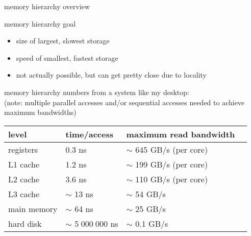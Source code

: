 \begin{frame}{memory hierarchy overview}
\end{frame}

\begin{frame}{memory hierarchy goal}
    \begin{itemize}
    \item size of largest, slowest storage
    \item speed of smallest, fastest storage
        \vspace{.5cm}
    \item not actually possible, but can get pretty close due to locality
    \end{itemize}
\end{frame}

\begin{frame}{memory hierarchy numbers}
from a system like my desktop: \\
    {\small (note: multiple parallel accesses and/or sequential accesses needed to achieve maximum bandwidths)} \\
\begin{tabular}{l|lll}
level & time/access & maximum read bandwidth \\ \hline
registers & 0.3 ns & $\sim$ 645 GB/s (per core)\\
L1 cache & 1.2 ns & $\sim$ 199 GB/s (per core) \\
L2 cache & 3.6 ns & $\sim$ 110 GB/s (per core)\\
L3 cache & $\sim$ 13 ns & $\sim$ 54 GB/s \\
main memory & $\sim$ 64 ns & $\sim$ 25 GB/s \\
hard disk & $\sim$ 5$\;$000$\;$000 ns & $\sim$ 0.1 GB/s \\
\end{tabular}
\end{frame}

